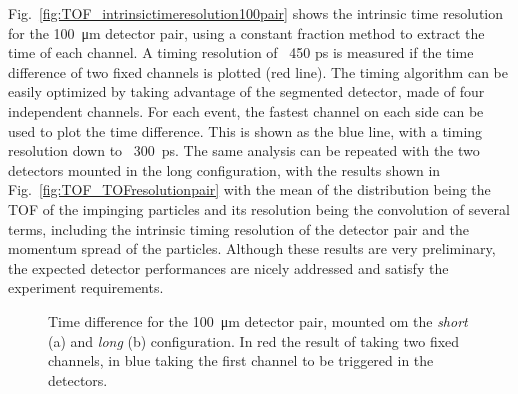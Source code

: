 \begin{refsection}
        \noindent
        Fig.~\ref{fig:TOF_intrinsictimeresolution100pair} shows the intrinsic time resolution for the \SI{100}{\micro m} detector pair, using a constant fraction method to extract the time of each channel. 
        A timing resolution of ~450 ps is measured if the time difference of two fixed channels is plotted (red line). 
        The timing algorithm can be easily optimized by taking advantage of the segmented detector, made of four independent channels. 
        For each event, the fastest channel on each side can be used to plot the time difference. 
        This is shown as the blue line, with a timing resolution down to ~\SI{300}{ps}. 
        The same analysis can be repeated with the two detectors mounted in the long configuration, with the results shown in Fig.~\ref{fig:TOF_TOFresolutionpair} with the mean of the distribution being the TOF of the impinging particles and its resolution being the convolution of several terms, including the intrinsic timing resolution of the detector pair and the momentum spread of the particles.
        \noindent
        Although these results are very preliminary, the expected detector performances are nicely addressed and satisfy the experiment requirements.


        \begin{figure}
            \centering 
            \caption{Time difference for the \SI{100}{\micro m} detector pair, mounted om the \textit{short} (a) and \textit{long} (b) configuration. In red the result of taking two fixed channels, in blue taking the first channel to be triggered in the detectors.}
        \end{figure}


\end{refsection}
